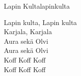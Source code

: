 \begin{song}{Lapin Kulta}{lapinkulta}
\begin{vers}
Lapin kulta, Lapin kulta\\
Karjala, Karjala\\
Aura sekä Olvi\\
Aura sekä Olvi\\
Koff Koff Koff\\
Koff Koff Koff\\
\end{vers}
\end{song}
